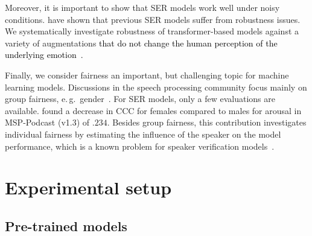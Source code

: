 \documentclass{article}
\newcommand{\review}[1]{\textcolor{black}{#1}}
\newcommand\msppodcast{\mbox{MSP-Podcast}}
\newcommand{\eg}{e.\,g.\ }
\begin{document}
Moreover, it is important to show
that \ac{SER} models work well under noisy conditions.
\citet{jaiswal2021robustness,pappagari2020robustness,Oates19-RSE,Triantafyllopoulos19-TRS} have shown
that previous \ac{SER} models suffer from robustness issues.
We systematically investigate robustness of transformer-based models
against a variety of augmentations
\review{
that 
do not change the human perception
of the underlying emotion~\citep{jaiswal2021robustness}.
}

Finally,
we consider fairness an important,
but challenging topic for machine learning models.
Discussions in the speech processing community focus mainly on group fairness,
\eg gender~\citep{rajan2021fairness}. 
For \ac{SER} models,
only a few evaluations are available.
\citet{gorrostieta2019gender} found a decrease in \ac{CCC} for females
compared to males for arousal in {\msppodcast} (v1.3) of $.234$.
Besides group fairness,
this contribution investigates individual fairness
by estimating the influence of the speaker on the model performance,
which is a known problem for speaker verification models~\citep{doddington1998sheep}.





\section{Experimental setup}
\label{sec:setup}





\subsection{Pre-trained models}
\label{subsec:models}
\end{document}
